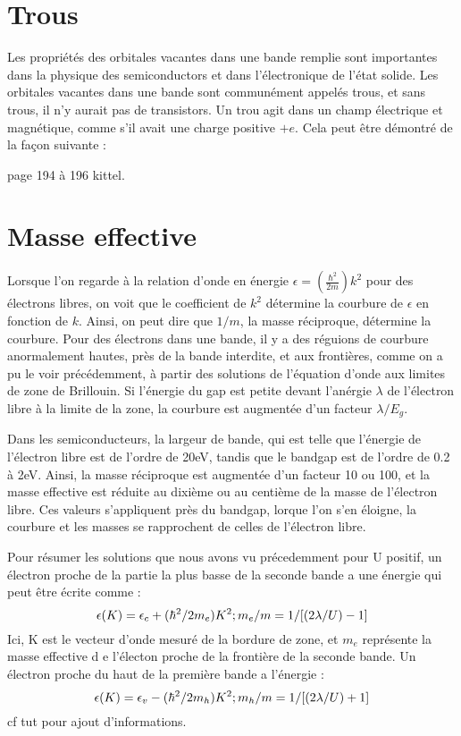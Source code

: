 \section{Trous}

Les propriétés des orbitales vacantes dans une bande remplie sont importantes
dans la physique des semiconductors et dans l'électronique de l'état solide. Les
orbitales vacantes dans une bande sont communément appelés trous, et sans trous,
il n'y aurait pas de transistors. Un trou agit dans un champ électrique et
magnétique, comme s'il avait une charge positive $+e$. Cela peut être démontré de
la façon suivante :

page 194 à 196 kittel.

\section{Masse effective}
Lorsque l'on regarde à la relation d'onde en énergie $\epsilon =
(\frac{\hbar^2}{2m})k^2$ pour des électrons libres, on voit que le coefficient de
$k^2$ détermine la courbure de $\epsilon$ en fonction de $k$. Ainsi, on peut dire
que $1/m$, la masse réciproque, détermine la courbure. Pour des électrons dans
une bande, il y a des réguions de courbure anormalement hautes, près de la bande
interdite, et aux frontières, comme on a pu le voir précédemment, à partir des
solutions de l'équation d'onde aux limites de zone de Brillouin. Si l'énergie du
gap est petite devant l'anérgie $\lambda$ de l'électron libre à la limite de la
zone, la courbure est augmentée d'un facteur $\lambda/E_g$.

Dans les semiconducteurs, la largeur de bande, qui est telle que l'énergie de
l'électron libre est de l'ordre de 20eV, tandis que le bandgap est de l'ordre de
0.2 à 2eV. Ainsi, la masse réciproque est augmentée d'un facteur 10 ou 100, et la
masse effective est réduite au dixième ou au centième de la masse de l'électron
libre. Ces valeurs s'appliquent près du bandgap, lorque l'on s'en éloigne, la
courbure et les masses se rapprochent de celles de l'électron libre.

Pour résumer les solutions que nous avons vu précedemment pour U positif, un
électron proche de la partie la plus basse de la seconde bande a une énergie qui
peut être écrite comme :
\begin{equation}
    \epsilon(K) = \epsilon_c + (\hbar^2/2m_e)K^2 ; \hfill m_e/m =
    1/[(2\lambda/U)-1]
\end{equation}
Ici, K est le vecteur d'onde mesuré de la bordure de zone, et $m_e$ représente la
masse effective d e l'électon proche de la frontière de la seconde bande. Un
électron proche du haut de la première bande a l'énergie :
\begin{equation}
    \epsilon(K) = \epsilon_v - (\hbar^2/2m_h)K^2 ; \hfill m_h/m =
    1/[(2\lambda/U)+1]
\end{equation}
cf tut pour ajout d'informations.

